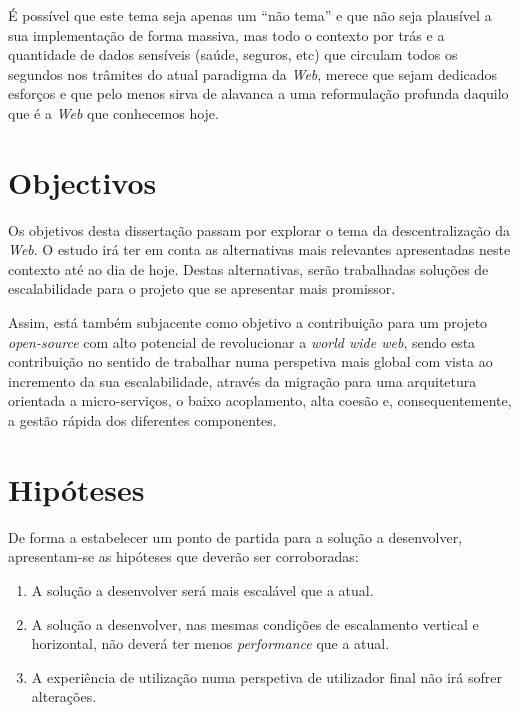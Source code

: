 É possível que este tema seja apenas um “não tema” e que não seja plausível a sua implementação de forma massiva, mas todo o contexto por trás e a quantidade de dados sensíveis (saúde, seguros, etc) que circulam todos os segundos nos trâmites do atual paradigma da \emph{Web},
merece que sejam dedicados esforços e que pelo menos sirva de alavanca a uma reformulação profunda daquilo que é a \emph{Web} que conhecemos hoje\cite{why_web_decentralization_future}.

\section{Objectivos \label{objetivos}}
Os objetivos desta dissertação passam por explorar o tema da descentralização da \emph{Web}. O estudo irá ter em conta as alternativas mais relevantes apresentadas neste contexto até ao dia de hoje. Destas alternativas, serão trabalhadas soluções de escalabilidade para o projeto que se apresentar mais promissor.

Assim, está também subjacente como objetivo a contribuição para um projeto \emph{open-source} com alto potencial de revolucionar a \emph{world wide web}, sendo esta contribuição no sentido de trabalhar numa perspetiva mais global com vista ao incremento da sua escalabilidade, através da migração para uma arquitetura orientada a micro-serviços, o baixo acoplamento, alta coesão e, consequentemente, a gestão rápida dos diferentes componentes.

\section{Hipóteses \label{section_hypothesis}}
De forma a estabelecer um ponto de partida para a solução a desenvolver, apresentam-se as hipóteses que deverão ser corroboradas:
\begin{enumerate}
    \item A solução a desenvolver será mais escalável que a atual.
    \item A solução a desenvolver, nas mesmas condições de escalamento vertical e horizontal, não deverá ter menos \emph{performance} que a atual.
    \item A experiência de utilização numa perspetiva de utilizador final não irá sofrer alterações.
\end{enumerate}

